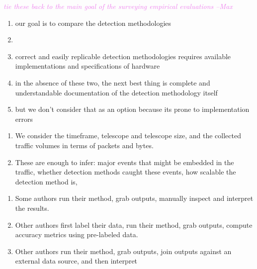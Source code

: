\documentclass[manuscript,nonacm]{acmart}
\newcommand{\maxnote}[1]{\textit{\textcolor{violet}{#1 --Max}}}
\begin{document}
\maxnote{tie these back to the main goal of the surveying empirical evaluations}

\begin{enumerate}
    \item our goal is to compare the detection methodologies
    \item 
    \item correct and easily replicable detection methodologies requires available implementations and specifications of hardware 
    \item in the absence of these two, the next best thing is complete and understandable documentation of the detection methodology itself
    \item but we don't consider that as an option because its prone to implementation errors
\end{enumerate}

\begin{enumerate}
    \item We consider the timeframe, telescope and telescope size, and the collected traffic volumes in terms of packets and bytes.
    \item These are enough to infer: major events that might be embedded in the traffic, whether detection methods caught these events, how scalable the detection method is, 
\end{enumerate}

\begin{enumerate}
    \item Some authors run their method, grab outputs, manually inspect and interpret the results.
    \item Other authors first label their data, run their method, grab outputs, compute accuracy metrics using pre-labeled data.
    \item Other authors run their method, grab outputs, join outputs against an external data source, and then interpret
\end{enumerate}


\end{document}
